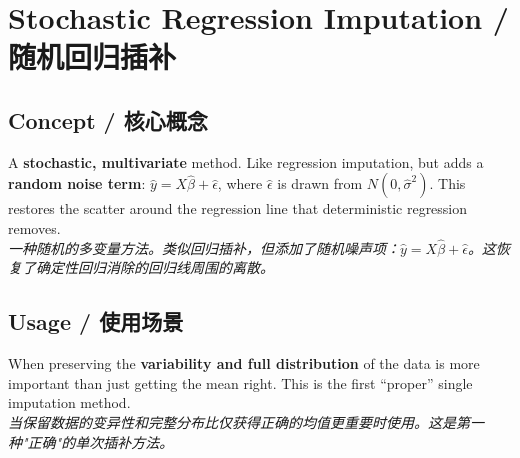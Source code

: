 \documentclass[9pt, a4paper]{article}
\begin{document}
\section{Stochastic Regression Imputation / 随机回归插补}

\subsection{Concept / 核心概念}
\begin{tcolorbox}[defbox]
    A \textbf{stochastic, multivariate} method. Like regression imputation, but adds a \textbf{random noise term}: $\hat{y} = X\hat{\beta} + \hat{\epsilon}$, where $\hat{\epsilon}$ is drawn from $N(0, \hat{\sigma}^2)$. This restores the scatter around the regression line that deterministic regression removes.\\
    \textit{一种随机的多变量方法。类似回归插补，但添加了随机噪声项：$\hat{y} = X\hat{\beta} + \hat{\epsilon}$。这恢复了确定性回归消除的回归线周围的离散。}
\end{tcolorbox}

\subsection{Usage / 使用场景}
When preserving the \textbf{variability and full distribution} of the data is more important than just getting the mean right. This is the first ``proper'' single imputation method.\\
\textit{当保留数据的变异性和完整分布比仅获得正确的均值更重要时使用。这是第一种"正确"的单次插补方法。}
\end{document}
